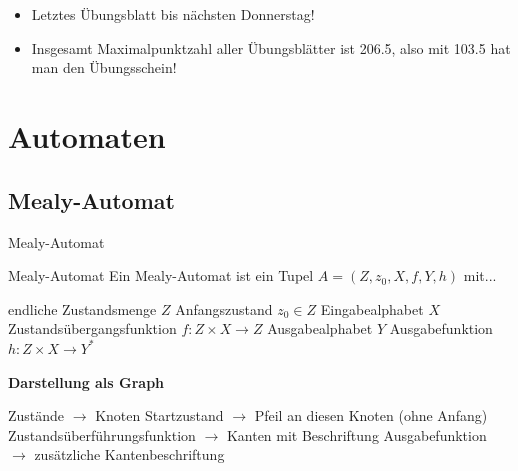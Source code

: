 \def\tutdate{02.02.2017}


\ifdefined\compiletype
\else
\section*{}
\begin{frame}
	\begin{itemize}
		\item Letztes Übungsblatt bis nächsten Donnerstag!
		\item Insgesamt Maximalpunktzahl aller Übungsblätter ist 206.5, also mit 103.5 hat man den Übungsschein!
	\end{itemize}
\end{frame}
\fi

\section{Automaten}
\subsection{Mealy-Automat}
\begin{frame}{Mealy-Automat}
	\begin{block}{Mealy-Automat}
		Ein Mealy-Automat ist ein Tupel $A = (Z, z_0, X, f, Y, h)$ mit...
		\begin{itemize}
			\pitem endliche Zustandsmenge $Z$
			\pitem Anfangszustand $z_0 \in Z$
			\pitem Eingabealphabet $X$
			\pitem Zustandsübergangsfunktion $f: Z \times X \rightarrow Z$
			\pitem Ausgabealphabet $Y$
			\pitem Ausgabefunktion $h: Z \times X \rightarrow Y^*$
		\end{itemize}
	\end{block}

	\pause 
	
	
	\textbf{Darstellung als Graph}\\
	\begin{itemize}
		\pitem Zustände $\rightarrow$ Knoten
		\pitem Startzustand $\rightarrow$ Pfeil an diesen Knoten (ohne Anfang)
		\pitem Zustandsüberführungsfunktion $\rightarrow$ Kanten mit Beschriftung
		\pitem Ausgabefunktion $\rightarrow$ zusätzliche Kantenbeschriftung
	\end{itemize}
\end{frame}

